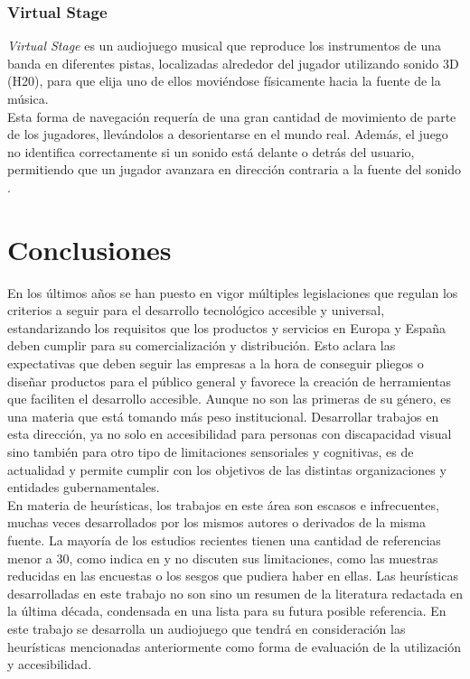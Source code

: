 \subsubsection{Virtual Stage}
\textit{Virtual Stage} es un audiojuego musical que reproduce los instrumentos de una banda en diferentes pistas, localizadas alrededor del jugador utilizando sonido 3D (H20), para que elija uno de ellos moviéndose físicamente hacia la fuente de la música. \\

Esta forma de navegación requería de una gran cantidad de movimiento de parte de los jugadores, llevándolos a desorientarse en el mundo real. Además, el juego no identifica correctamente si un sonido está delante o detrás del usuario, permitiendo que un jugador avanzara en dirección contraria a la fuente del sonido \cite[p~6]{deoliveiraVirtualStageImmersive2015a}. \\

\section{Conclusiones}
En los últimos años se han puesto en vigor múltiples legislaciones que regulan los criterios a seguir para el desarrollo tecnológico accesible y universal, estandarizando los requisitos que los productos y servicios en Europa y España deben cumplir para su comercialización y distribución. Esto aclara las expectativas que deben seguir las empresas a la hora de conseguir pliegos o diseñar productos para el público general y favorece la creación de herramientas que faciliten el desarrollo accesible. Aunque no son las primeras de su género, es una materia que está tomando más peso institucional. Desarrollar trabajos en esta dirección, ya no solo en accesibilidad para personas con discapacidad visual sino también para otro tipo de limitaciones sensoriales y cognitivas, es de actualidad y permite cumplir con los objetivos de las distintas organizaciones y entidades gubernamentales. \\

En materia de heurísticas, los trabajos en este área son escasos e infrecuentes, muchas veces desarrollados por los mismos autores o derivados de la misma fuente. La mayoría de los estudios recientes tienen una cantidad de referencias menor a 30, como indica en  \cite{romerodesouzaferreyraModelosParaAnalisis2017} y no discuten sus limitaciones, como las muestras reducidas en las encuestas o los sesgos que pudiera haber en ellas. Las heurísticas desarrolladas en este trabajo no son sino un resumen de la literatura redactada en la última década, condensada en una lista para su futura posible referencia. En este trabajo se desarrolla un audiojuego que tendrá en consideración las heurísticas mencionadas anteriormente como forma de evaluación de la utilización y accesibilidad.\\

